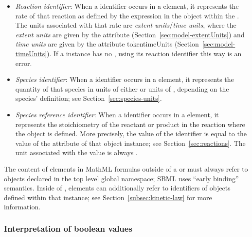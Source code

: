 \begin{itemize}
\begin{itemize}
  \item \emph{Reaction identifier}: When a \Reaction identifier
    occurs in a  element, it represents the rate of that
    reaction as defined by the  expression in the
    \KineticLaw object within the \Reaction.  The units associated
    with that rate are \emph{extent units}/\emph{time units},
    where the \emph{extent units} are given by the \Model
    attribute 
    (Section~\ref{sec:model-extentUnits}) and \emph{time units}
    are given by the \Model attribute token{timeUnits}
    (Section~\ref{sec:model-timeUnits}).  If a \Reaction instance
    has no \KineticLaw, using its reaction identifier this way is
    an error.
    
  \item \emph{Species identifier}: When a \Species identifier
    occurs in a  element, it represents the quantity of
    that species in units of either 
    or units of , depending on the
    species' definition; see Section~\ref{sec:species-units}.

  \item \emph{Species reference identifier}: When a
    \SpeciesReference identifier occurs in a  element,
    it represents the stoichiometry of the reactant or product in
    the reaction where the \SpeciesReference object is defined.
    More precisely, the value of the \SpeciesReference
    identifier is equal to the value of the 
    attribute of that \SpeciesReference object instance; see
    Section~\ref{sec:reactions}.  The unit associated with the
    value is always .
    
  \end{itemize}

\end{itemize}

The content of  elements in MathML formulas outside of a
\KineticLaw or \FunctionDefinition must always refer to objects
declared in the top level global namespace; \ie SBML uses ``early
binding'' semantics.  Inside of \KineticLaw,  elements
can additionally refer to identifiers of \LocalParameter objects
defined within that \KineticLaw instance; see
Section~\ref{subsec:kinetic-law} for more information.


\subsubsection{Interpretation of boolean values}
\label{sec:handling-booleans}

